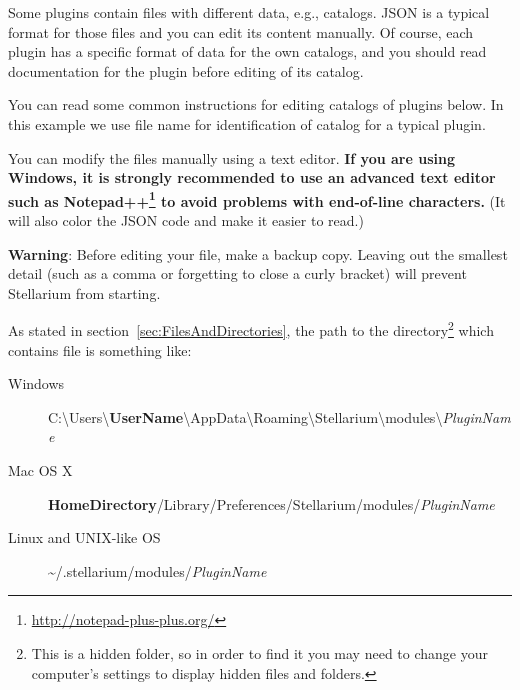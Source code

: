 Some plugins contain files with different data, e.g., catalogs. JSON is a
typical format for those files and you can edit its content manually. Of
course, each plugin has a specific format of data for the own catalogs, and
you should read documentation for the plugin before editing of its catalog.

You can read some common instructions for editing catalogs of plugins
below. In this example we use file name  for
identification of catalog for a typical plugin.

You can modify the  files manually using a text
editor. \textbf{If you are using Windows, it is strongly recommended to
use an advanced text editor such as
Notepad++\footnote{\url{http://notepad-plus-plus.org/}} to avoid problems with
end-of-line characters.} (It will also color the JSON code and make it
easier to read.)

\textbf{Warning}: Before editing your  file, make a
backup copy. Leaving out the smallest detail (such as a comma or
forgetting to close a curly bracket) will prevent Stellarium from
starting.

As stated in section~\ref{sec:FilesAndDirectories}, the path to the
directory\footnote{This is a hidden folder, so in order to find it you
  may need to change your computer's settings to display hidden files
  and folders.} which contains  file is something
like:

\begin{description}
\item[Windows]
  C:\textbackslash Users\textbackslash\textbf{UserName}\textbackslash AppData\textbackslash Roaming\textbackslash Stellarium\textbackslash modules\textbackslash \textit{PluginName}
\item[Mac OS X]
  \textbf{HomeDirectory}/Library/Preferences/Stellarium/modules/\textit{PluginName}
\item[Linux and UNIX-like OS]
  \textasciitilde{}/.stellarium/modules/\textit{PluginName}
\end{description}



